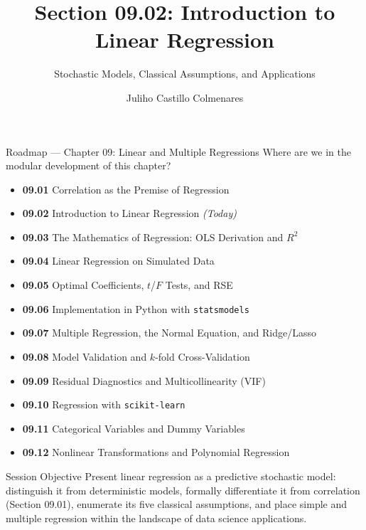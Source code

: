 \documentclass[10pt, aspectratio=169]{beamer}
\title[Introduction to Regression]{Section 09.02: Introduction to Linear Regression}
\subtitle{Stochastic Models, Classical Assumptions, and Applications}
\author[J. Castillo Colmenares]{Juliho Castillo Colmenares}
\institute{Tecnológico de Monterrey}
\date{\vspace{-1.5cm}}
\begin{document}
\begin{frame}[plain]
  \titlepage
\end{frame}

\begin{frame}{Roadmap --- Chapter 09: Linear and Multiple Regressions}
  \scriptsize
  Where are we in the modular development of this chapter?
  \begin{itemize}\itemsep=0.02em
    \item \textbf{09.01} Correlation as the Premise of Regression
    \item \textbf{09.02} Introduction to Linear Regression \emph{(Today)}
    \item \textbf{09.03} The Mathematics of Regression: OLS Derivation and $R^2$
    \item \textbf{09.04} Linear Regression on Simulated Data
    \item \textbf{09.05} Optimal Coefficients, $t$/$F$ Tests, and RSE
    \item \textbf{09.06} Implementation in Python with \texttt{statsmodels}
    \item \textbf{09.07} Multiple Regression, the Normal Equation, and Ridge/Lasso
    \item \textbf{09.08} Model Validation and $k$-fold Cross-Validation
    \item \textbf{09.09} Residual Diagnostics and Multicollinearity (VIF)
    \item \textbf{09.10} Regression with \texttt{scikit-learn}
    \item \textbf{09.11} Categorical Variables and Dummy Variables
    \item \textbf{09.12} Nonlinear Transformations and Polynomial Regression
  \end{itemize}
  \pause
  \vspace{-0.05cm}
  \begin{block}{Session Objective}
    Present linear regression as a predictive stochastic model: distinguish it from deterministic models, formally differentiate it from correlation (Section 09.01), enumerate its five classical assumptions, and place simple and multiple regression within the landscape of data science applications.
  \end{block}
\end{frame}
\end{document}
